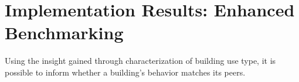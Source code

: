 \section{Implementation Results: Enhanced Benchmarking}
\label{sec:results_benchmarking}

Using the insight gained through characterization of building use type, it is possible to inform whether a building's behavior matches its peers.
